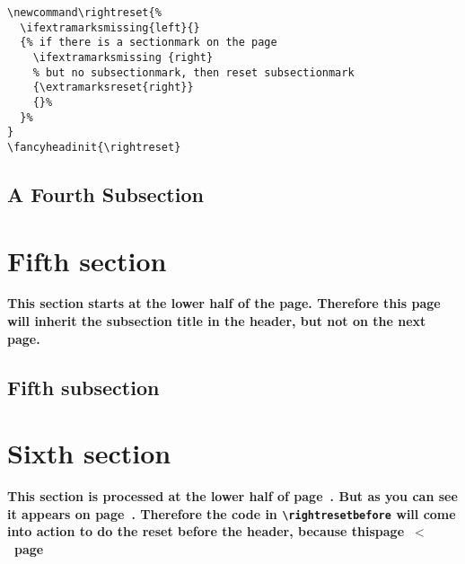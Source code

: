 \documentclass{article}
\newcommand\rightreset{%
  \ifextramarksmissing{left}{}
  {%
    \ifextramarksmissing {right}
    {\extramarksreset{right}}
    {}%
  }%
}
\newcounter{thispage}
\newcommand\rightresetbefore{%
  \ifnum \value{thispage}<\value{page}\rightreset\fi
}
\begin{document}
\begin{verbatim}
\newcommand\rightreset{%
  \ifextramarksmissing{left}{}
  {% if there is a sectionmark on the page
    \ifextramarksmissing {right}
    % but no subsectionmark, then reset subsectionmark
    {\extramarksreset{right}}
    {}%
  }%
}
\fancyheadinit{\rightreset}
\end{verbatim}

\medskip

\lipsum

\subsection{A Fourth Subsection}

\lipsum[8-11]

\section{Fifth section}

\textbf{This section starts at the lower half of the page. Therefore this page will inherit the subsection title in the header, but not on the next page.}

\medskip

\lipsum[1-7]

\subsection{Fifth subsection}

\lipsum[8-16]

\vspace{2cm}

\section{Sixth section}
\label{sec:six}

{\bfseries This section is processed at the lower half of  page~\thethispage. But as you can see it appears on page~\pageref{sec:six}. Therefore the code in \verb|\rightresetbefore| will come into action to do the reset before the header, because \mbox{thispage $<$ page}}

\medskip

\lipsum[1-6]
\end{document}
